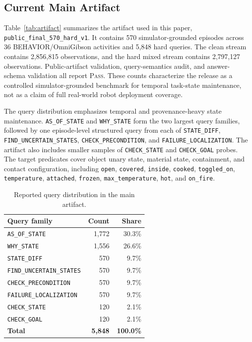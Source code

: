 \subsection{Current Main Artifact}

Table~\ref{tab:artifact} summarizes the artifact used in this paper, \texttt{public\_final\_570\_hard\_v1}. It contains 570 simulator-grounded episodes across 36 BEHAVIOR/OmniGibson activities and 5,848 hard queries. The clean stream contains 2,856,815 observations, and the hard mixed stream contains 2,797,127 observations. Public-artifact validation, query-semantics audit, and answer-schema validation all report \textsc{Pass}. These counts characterize the release as a controlled simulator-grounded benchmark for temporal task-state maintenance, not as a claim of full real-world robot deployment coverage.

The query distribution emphasizes temporal and provenance-heavy state maintenance. \texttt{AS\_OF\_STATE} and \texttt{WHY\_STATE} form the two largest query families, followed by one episode-level structured query from each of \texttt{STATE\_DIFF}, \texttt{FIND\_UNCERTAIN\_STATES}, \texttt{CHECK\_PRECONDITION}, and \texttt{FAILURE\_LOCALIZATION}. The artifact also includes smaller samples of \texttt{CHECK\_STATE} and \texttt{CHECK\_GOAL} probes. The target predicates cover object unary state, material state, containment, and contact configuration, including \texttt{open}, \texttt{covered}, \texttt{inside}, \texttt{cooked}, \texttt{toggled\_on}, \texttt{temperature}, \texttt{attached}, \texttt{frozen}, \texttt{max\_temperature}, \texttt{hot}, and \texttt{on\_fire}.

\begin{table}[!t]
\caption{Reported query distribution in the main artifact.}
\label{tab:query-distribution}
\centering
\scriptsize
\setlength{\tabcolsep}{4pt}
\renewcommand{\arraystretch}{1.12}
\begingroup
{}
\begin{tabular}{@{}p{0.58\linewidth}rr@{}}
\toprule
\rowcolor{gray!15}
\textbf{Query family} & \textbf{Count} & \textbf{Share} \\
\midrule
\texttt{AS\_OF\_STATE} & 1,772 & 30.3\% \\
\texttt{WHY\_STATE} & 1,556 & 26.6\% \\
\texttt{STATE\_DIFF} & 570 & 9.7\% \\
\texttt{FIND\_UNCERTAIN\_STATES} & 570 & 9.7\% \\
\texttt{CHECK\_PRECONDITION} & 570 & 9.7\% \\
\texttt{FAILURE\_LOCALIZATION} & 570 & 9.7\% \\
\texttt{CHECK\_STATE} & 120 & 2.1\% \\
\texttt{CHECK\_GOAL} & 120 & 2.1\% \\
\midrule
\textbf{Total} & \textbf{5,848} & \textbf{100.0\%} \\
\bottomrule
\end{tabular}
\endgroup
\end{table}

